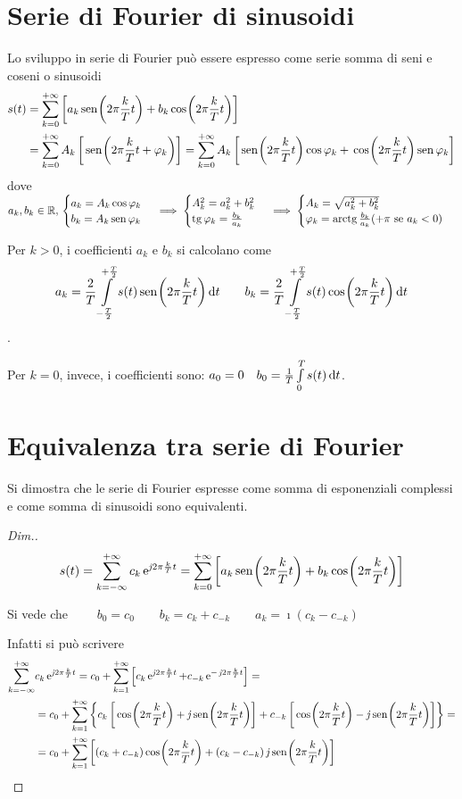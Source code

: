 \section{Serie di Fourier di sinusoidi}
Lo sviluppo in serie di Fourier può essere espresso come serie somma di seni e coseni o sinusoidi
\begin{align*}
s(t)&=\sum_{k=0}^{+\infty}\left[ a_k \,{\operatorname{sen}}^{}\!\left({2\pi\frac{k}{T}t}\right) + b_k \,{\operatorname{cos}}^{}\!\left({2\pi\frac{k}{T}t}\right)\right] \\
&=\sum_{k=0}^{+\infty}A_k\left[\,{\operatorname{sen}}^{}\!\left({2\pi\frac{k}{T}t+\varphi_k}\right)\right] =\sum_{k=0}^{+\infty}A_k\left[\,{\operatorname{sen}}^{}\!\left({2\pi\frac{k}{T}t}\right)\operatorname{cos}\varphi_k +\,{\operatorname{cos}}^{}\!\left({2\pi\frac{k}{T}t}\right)\operatorname{sen}\varphi_k \right]
\end{align*}
dove $a_k,b_k \in\mathbb{R},\,\begin{cases}a_k=A_k\operatorname{cos}\varphi_k \\b_k=A_k\operatorname{sen}\varphi_k \end{cases}\implies\begin{cases}A_k^2=a_k^2+b_k^2\\ \operatorname{tg}\varphi_k=\frac{b_k}{a_k} \end{cases}\implies\begin{cases}A_k=\sqrt{a_k^2+b_k^2}\\ \varphi_k=\operatorname{arctg}\frac{b_k}{a_k} (+\pi\text{ se }a_k<0) \end{cases}$

Per $k>0$, i coefficienti $a_k$ e $b_k$ si calcolano come
\[a_k=\frac{2}{T}\int\limits_{-\frac{T}{2}}^{+\frac{T}{2}}{s(t)\,{\operatorname{sen}}^{}\!\left({2\pi\frac{k}{T}t}\right)}{\,\mathop{}\!\mathrm{d}{t}} \qquad b_k=\frac{2}{T}\int\limits_{-\frac{T}{2}}^{+\frac{T}{2}}{s(t)\,{\operatorname{cos}}^{}\!\left({2\pi\frac{k}{T}t}\right)}{\,\mathop{}\!\mathrm{d}{t}}\].

Per $k=0$, invece, i coefficienti sono: $a_0=0 \quad b_0=\frac{1}{T}\int\limits_{0}^{T}{s(t)}{\,\mathop{}\!\mathrm{d}{t}}$.

\section{Equivalenza tra serie di Fourier}
Si dimostra che le serie di Fourier espresse come somma di esponenziali complessi e come somma di sinusoidi sono equivalenti.

\begin{proof}[Dim.]
\[s(t)=\sum_{k=-\infty}^{+\infty} c_k \operatorname{e}^{\operatorname{\mathit{j}\!} 2\pi\frac{k}{T}t} = \sum_{k=0}^{+\infty}\left[ a_k \,{\operatorname{sen}}^{}\!\left({2\pi\frac{k}{T}t}\right) + b_k \,{\operatorname{cos}}^{}\!\left({2\pi\frac{k}{T}t}\right)\right]
\]

Si vede che $\qquad b_0=c_0 \qquad b_k=c_k+c_{-k} \qquad a_k=\imath (c_k-c_{-k})$

Infatti si può scrivere
\begin{align*}
\sum_{k=-\infty}^{+\infty} & c_k \e{\imath 2\pi\frac{k}{T}t} = c_0+ \sum_{k=1}^{+\infty} \left[ c_k \e{\imath 2\pi\frac{k}{T}t} + c_{-k} \e{-\imath 2\pi\frac{k}{T}t} \right] = \\
&= c_0 + \sum_{k=1}^{+\infty} {\left\lbrace c_k \left[\cos{2\pi\frac{k}{T}t}+\imath\sen{2\pi\frac{k}{T}t}\right]
+c_{-k}\left[\cos{2\pi\frac{k}{T}t}-\imath\sen{2\pi\frac{k}{T}t}\right] \right\rbrace}=\\
&= c_0 + \sum_{k=1}^{+\infty} {\left[(c_k+c_{-k}) \cos{2\pi\frac{k}{T}t}+
(c_k-c_{-k})\imath\sen{2\pi\frac{k}{T}t}\right] }\qedhere\end{align*}
\end{proof}

